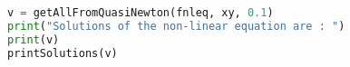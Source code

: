 \begin{lstlisting}[language=Python, style=jupycolors]
v = getAllFromQuasiNewton(fnleq, xy, 0.1)
print("Solutions of the non-linear equation are : ")
print(v)
printSolutions(v)
\end{lstlisting}